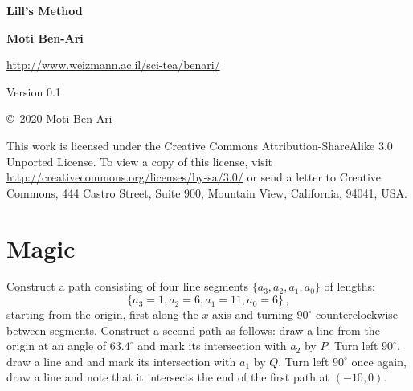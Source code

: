 \documentclass[11pt,a4paper]{article}
\begin{document}
\thispagestyle{empty}

\begin{center}
\textbf{\LARGE Lill's Method}

\bigskip
\bigskip

\textbf{\Large Moti Ben-Ari}

\bigskip
\bigskip

\url{http://www.weizmann.ac.il/sci-tea/benari/}

\bigskip
\bigskip

Version 0.1

\bigskip
\end{center}


\begin{small}
\begin{center}
\copyright{}\ 2020 Moti Ben-Ari
\end{center}

This work is licensed under the Creative Commons Attribution-ShareAlike 3.0 Unported License. To view a copy of this license, visit \url{http://creativecommons.org/licenses/by-sa/3.0/} or send a letter to Creative Commons, 444 Castro Street, Suite 900, Mountain View, California, 94041, USA.
\end{small}

\newpage

\section{Magic}

Construct a path consisting of four line segments $\{a_3,a_2,a_1,a_0\}$ of lengths:
\[
\{a_3=1,a_2=6,a_1=11,a_0=6\}\,,
\]
starting from the origin, first along the $x$-axis and turning $90^\circ$ counterclockwise between segments. Construct a second path as follows: draw a line from the origin at an angle of $63.4^\circ$ and mark its intersection with $a_2$ by $P$. Turn left $90^\circ$, draw a line and and mark its intersection with $a_1$ by $Q$. Turn left $90^\circ$ once again, draw a line and note that it intersects the end of the first path at $(-10,0)$. %
\end{document}
